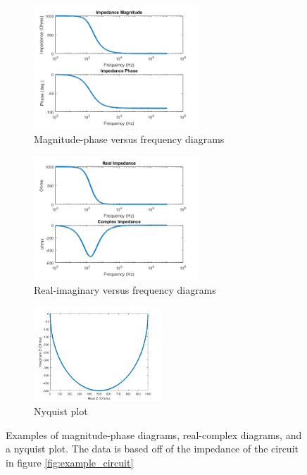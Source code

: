  
 \begin{figure}
    \centering
    \begin{subfigure}[b]{\textwidth}
        \centering
        \includegraphics[width=0.68\textwidth]{images/magPhaseExample.png}
        \caption{Magnitude-phase versus frequency diagrams}
        \label{fig:mag_phase_ex}
    \end{subfigure}
 
    \begin{subfigure}[b]{\textwidth}
        \centering
        \includegraphics[width=0.68\textwidth]{images/complexRealExample.png}
        \caption{Real-imaginary versus frequency diagrams}
        \label{fig:real_complex_ex}
    \end{subfigure}
    \begin{subfigure}[b]{\textwidth}
        \centering
        \includegraphics[width=0.52\textwidth]{images/nyquistExample.png}
        \caption{Nyquist plot}
        \label{fig:nyquist_plot}
    \end{subfigure}
    \caption[Impedance Diagrams]{Examples of magnitude-phase diagrams, real-complex diagrams, and a nyquist plot. The data is based off of the impedance of the circuit in figure \ref{fig:example_circuit}}
    \label{fig:impedance_diagrams}
\end{figure}

